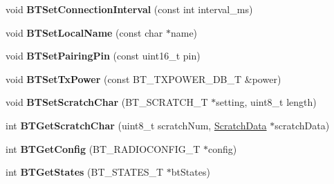 \begin{DoxyCompactItemize}
\item 
\hypertarget{class_bean_serial_transport_a1fe64ded13b4269a56c98a996fc20f05}{}void {\bfseries B\+T\+Set\+Connection\+Interval} (const int interval\+\_\+ms)\label{class_bean_serial_transport_a1fe64ded13b4269a56c98a996fc20f05}

\item 
\hypertarget{class_bean_serial_transport_a27afdc266fe1f173ba4a2019cb69350d}{}void {\bfseries B\+T\+Set\+Local\+Name} (const char $\ast$name)\label{class_bean_serial_transport_a27afdc266fe1f173ba4a2019cb69350d}

\item 
\hypertarget{class_bean_serial_transport_ae48266b8995f1fa11e0a0bbbd5cbdd3c}{}void {\bfseries B\+T\+Set\+Pairing\+Pin} (const uint16\+\_\+t pin)\label{class_bean_serial_transport_ae48266b8995f1fa11e0a0bbbd5cbdd3c}

\item 
\hypertarget{class_bean_serial_transport_a3e1ed8b0c6b64faac6972ab00847346a}{}void {\bfseries B\+T\+Set\+Tx\+Power} (const B\+T\+\_\+\+T\+X\+P\+O\+W\+E\+R\+\_\+\+D\+B\+\_\+\+T \&power)\label{class_bean_serial_transport_a3e1ed8b0c6b64faac6972ab00847346a}

\item 
\hypertarget{class_bean_serial_transport_a7aea57393ca8e62e2a168feee033ad6f}{}void {\bfseries B\+T\+Set\+Scratch\+Char} (B\+T\+\_\+\+S\+C\+R\+A\+T\+C\+H\+\_\+\+T $\ast$setting, uint8\+\_\+t length)\label{class_bean_serial_transport_a7aea57393ca8e62e2a168feee033ad6f}

\item 
\hypertarget{class_bean_serial_transport_a759a717b09e0b16d09f13e4933005efe}{}int {\bfseries B\+T\+Get\+Scratch\+Char} (uint8\+\_\+t scratch\+Num, \hyperlink{struct_scratch_data}{Scratch\+Data} $\ast$scratch\+Data)\label{class_bean_serial_transport_a759a717b09e0b16d09f13e4933005efe}

\item 
\hypertarget{class_bean_serial_transport_ac9e27763f095e7e19e39974e8f4ca4e5}{}int {\bfseries B\+T\+Get\+Config} (B\+T\+\_\+\+R\+A\+D\+I\+O\+C\+O\+N\+F\+I\+G\+\_\+\+T $\ast$config)\label{class_bean_serial_transport_ac9e27763f095e7e19e39974e8f4ca4e5}

\item 
\hypertarget{class_bean_serial_transport_a10ab229e8c4477203fe65222d6cb1d2b}{}int {\bfseries B\+T\+Get\+States} (B\+T\+\_\+\+S\+T\+A\+T\+E\+S\+\_\+\+T $\ast$bt\+States)\label{class_bean_serial_transport_a10ab229e8c4477203fe65222d6cb1d2b}


\end{DoxyCompactItemize}
